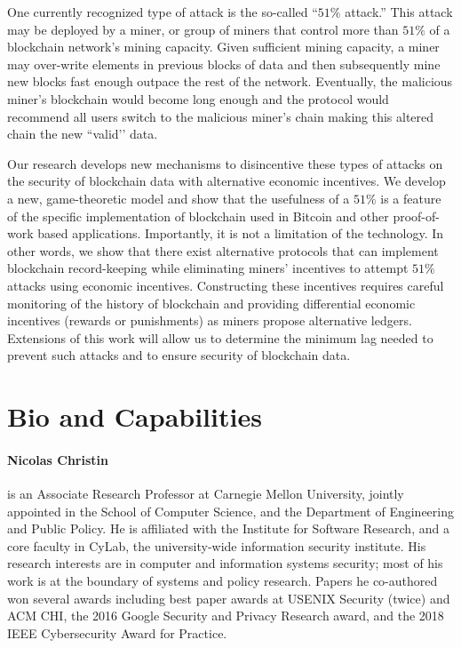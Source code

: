 \documentclass[runningheads, 12pt]{article}
\begin{document}
One currently recognized type of attack is the so-called “$51\%$ attack.” This attack may be deployed by a miner, or group of miners that control more than $51\%$ of a blockchain network’s mining capacity. Given sufficient mining capacity, a miner may over-write elements in previous blocks of data and then subsequently mine new blocks fast enough outpace the rest of the network. Eventually, the malicious miner’s blockchain would become long enough and the protocol would recommend all users switch to the malicious miner’s chain making this altered chain the new ``valid’’ data.



Our research develops new mechanisms to disincentive these types of attacks on the security of blockchain data with alternative economic incentives. We develop a new, game-theoretic model and show that the usefulness of a $51\%$ is a feature of the specific implementation of blockchain used in Bitcoin and other proof-of-work based applications. Importantly, it is not a limitation of the technology. In other words, we show that there exist alternative protocols that can implement blockchain record-keeping while eliminating miners’ incentives to attempt $51\%$ attacks using economic incentives. Constructing these incentives requires careful monitoring of the history of blockchain and providing differential economic incentives (rewards or punishments) as miners propose alternative ledgers. Extensions of this work will allow us to determine the minimum lag needed to prevent such attacks and to ensure security of blockchain data.

\vspace{-5pt}
\section{Bio and Capabilities}
\vspace{-4pt}

\paragraph{Nicolas Christin} is an Associate Research Professor at Carnegie Mellon University, jointly appointed in the School of Computer Science, and the Department of Engineering and Public Policy. He is affiliated with the Institute for Software Research, and a core faculty in CyLab, the university-wide information security institute. His research interests are in computer and information systems security; most of his work is at the boundary of systems and policy research. Papers he co-authored won several awards including best paper awards at USENIX Security (twice) and ACM CHI, the 2016 Google Security and Privacy Research award, and the 2018 IEEE Cybersecurity Award for Practice.
\end{document}
